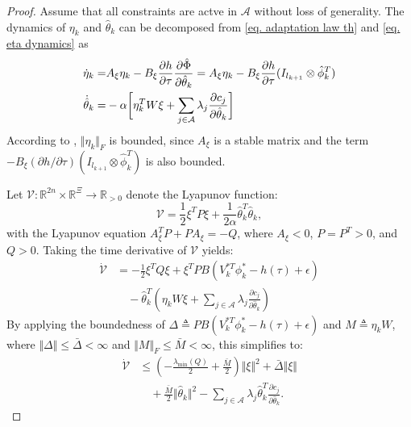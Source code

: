 \documentclass[lettersize,journal]{IEEEtran}
\begin{document}
\begin{proof}
Assume that all constraints are actve in $\mathcal A$ without loss of generality. The dynamics of $\eta_k$ and $\hat\theta_k$ can be decomposed from \eqref{eq. adaptation law th} and \eqref{eq. eta dynamics} as 
\begin{equation*}
    \begin{aligned}
        \dot\eta_k =
        & 
        A_\xi \eta_k -B_\xi {\partial h\over\partial\tau}{\partial \hat\Phi\over \partial \hat\theta_k}
        =
        A_\xi \eta_k -B_\xi {\partial h\over\partial\tau}(I_{l_{k+1}}\otimes \hat\phi_k^T)\\
        \dot{\hat\theta}_k =
        & -\alpha 
        \bigg[
            \eta_k^TW\xi+
            \sum_{j\in\mathcal{A}}
            \lambda_j{\partial c_j\over\partial \hat\theta_k}
        \bigg]
    \end{aligned} 
\end{equation*}
According to \cite[Chap.~4 T.~1.9]{RN13}, $\Vert \eta_k\Vert_F$ is bounded, since $A_\xi$ is a stable matrix and the term $-B_\xi(\partial h/\partial \tau)(I_{l_{k+1}}\otimes\hat\phi_k^T)$ is also bounded.

Let $\mathcal{V}: \mathbb{R}^{2n} \times \mathbb{R}^{\Xi} \to \mathbb{R}_{>0}$ denote the Lyapunov function:
\begin{equation}
    \mathcal{V} = \frac{1}{2} \xi^T P \xi + \frac{1}{2 \alpha} \hat{\theta}_k^T \hat{\theta}_k,
    \label{eq. Lyapunov func}
\end{equation}
with the Lyapunov equation $A_\xi^T P + P A_\xi = -Q$, where $A_\xi < 0$, $P = P^T > 0$, and $Q > 0$.
Taking the time derivative of $\mathcal{V}$ yields:
\begin{equation}
    \begin{aligned}
        \dot{\mathcal{V}} 
        &= -\frac{1}{2} \xi^T Q \xi + \xi^T P B (V_k^{*T} \phi_k^* - h(\tau) + \epsilon) \\
        &\quad - \hat{\theta}_k^T \left( \eta_k W \xi + \sum_{j \in \mathcal{A}} \lambda_j \frac{\partial c_j}{\partial \hat{\theta}_k} \right)
    \end{aligned}
    \label{eq. Lyapunov dot}
\end{equation}
By applying the boundedness of $\Delta \triangleq P B (V_k^{*T} \phi_k^* - h(\tau) + \epsilon)$ and $M \triangleq \eta_k W$, where $\Vert \Delta \Vert \leq \bar{\Delta} < \infty$ and $\Vert M \Vert_F \leq \bar{M} < \infty$, this simplifies to:
\begin{equation}
    \begin{aligned}
        \dot{\mathcal{V}} 
        &\leq \left( -\frac{\lambda_{\text{min}}(Q)}{2} + \frac{\bar{M}}{2} \right) \Vert \xi \Vert^2 + \bar{\Delta} \Vert \xi \Vert \\
        &\quad + \frac{\bar{M}}{2} \Vert \hat{\theta}_k \Vert^2 - \sum_{j \in \mathcal{A}} \lambda_j \hat{\theta}_k^T \frac{\partial c_j}{\partial \hat{\theta}_k}.
    \end{aligned}
    \label{eq. dot Vk 1}
\end{equation}


\end{proof}
\end{document}
